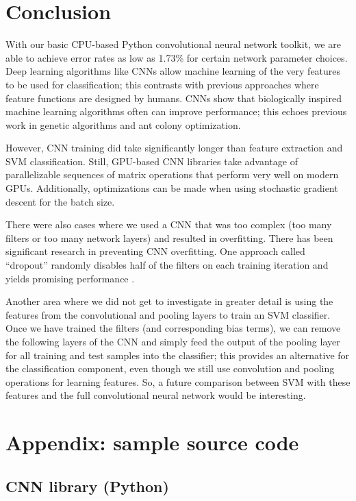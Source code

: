 \documentclass[10pt,twocolumn]{article}
\begin{document}
\section{Conclusion} \label{sec:conclude}

With our basic CPU-based Python convolutional neural network toolkit, we are able to achieve error rates as low as 1.73\% for certain network parameter choices. Deep learning algorithms like CNNs allow machine learning of the very features to be used for classification; this contrasts with previous approaches where feature functions are designed by humans. CNNs show that biologically inspired machine learning algorithms often can improve performance; this echoes previous work in genetic algorithms and ant colony optimization.

However, CNN training did take significantly longer than feature extraction and SVM classification. Still, GPU-based CNN libraries take advantage of parallelizable sequences of matrix operations that perform very well on modern GPUs. Additionally, optimizations can be made when using stochastic gradient descent for the batch size.

There were also cases where we used a CNN that was too complex (too many filters or too many network layers) and resulted in overfitting. There has been significant research in preventing CNN overfitting. One approach called ``dropout'' randomly disables half of the filters on each training iteration and yields promising performance \cite{dropout}.

Another area where we did not get to investigate in greater detail is using the features from the convolutional and pooling layers to train an SVM classifier. Once we have trained the filters (and corresponding bias terms), we can remove the following layers of the CNN and simply feed the output of the pooling layer for all training and test samples into the classifier; this provides an alternative for the classification component, even though we still use convolution and pooling operations for learning features. So, a future comparison between SVM with these features and the full convolutional neural network would be interesting.

\section{Appendix: sample source code}

\subsection{CNN library (Python)}
\end{document}
